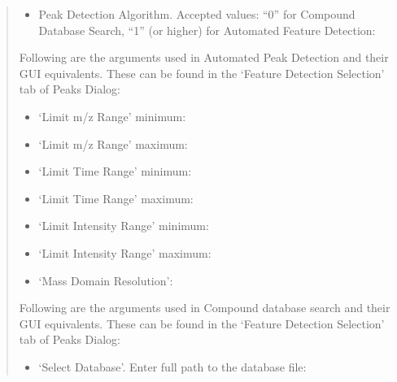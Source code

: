 \documentclass[letterpaper,10pt,english,openany,oneside]{sphinxmanual}
\begin{document}
\begin{quote}
\begin{itemize}
\item {} 
Peak Detection Algorithm. Accepted values: “0” for Compound Database Search, “1” (or higher) for Automated Feature Detection: 

\end{itemize}

Following are the arguments used in Automated Peak Detection and their GUI equivalents. These can be found in the ‘Feature Detection Selection’ tab of Peaks Dialog:
\begin{itemize}
\item {} 
‘Limit m/z Range’ minimum: 

\item {} 
‘Limit m/z Range’ maximum: 

\item {} 
‘Limit Time Range’ minimum: 

\item {} 
‘Limit Time Range’ maximum: 

\item {} 
‘Limit Intensity Range’ minimum: 

\item {} 
‘Limit Intensity Range’ maximum: 

\item {} 
‘Mass Domain Resolution’: 

\end{itemize}

Following are the arguments used in Compound database search and their GUI equivalents. These can be found in the ‘Feature Detection Selection’ tab of Peaks Dialog:
\begin{itemize}
\item {} 
‘Select Database’. Enter full path to the database file: 


\end{itemize}
\end{quote}
\end{document}
